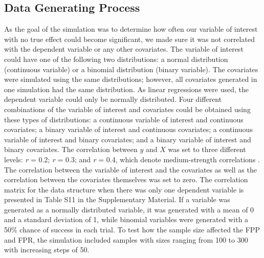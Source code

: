 \subsection{Data Generating Process}
As the goal of the simulation was to determine how often our variable of interest with no true effect could become significant, we made sure it was not correlated with the dependent variable or any other covariates. The variable of interest could have one of the following two distributions: a normal distribution (continuous variable) or a binomial distribution (binary variable). The covariates were simulated using the same distributions; however, all covariates generated in one simulation had the same distribution. As linear regressions were used, the dependent variable could only be normally distributed. Four different combinations of the variable of interest and covariates could be obtained using these types of distributions: a continuous variable of interest and continuous covariates; a binary variable of interest and continuous covariates; a continuous variable of interest and binary covariates; and a binary variable of interest and binary covariates. 
The correlation between $y$ and $X$ was set to three different levels: \textit{r} = 0.2; \textit{r} = 0.3; and \textit{r} = 0.4, which denote medium-strength correlations \citep{Cohen1989}. The correlation between the variable of interest and the covariates as well as the correlation between the covariates themselves was set to zero. The correlation matrix for the data structure when there was only one dependent variable is presented in Table S11 in the Supplementary Material. If a variable was generated as a normally distributed variable, it was generated with a mean of 0 and a standard deviation of 1, while binomial variables were generated with a 50\% chance of success in each trial. To test how the sample size affected the FPP and FPR, the simulation included samples with sizes ranging from 100 to 300 with increasing steps of 50. 


